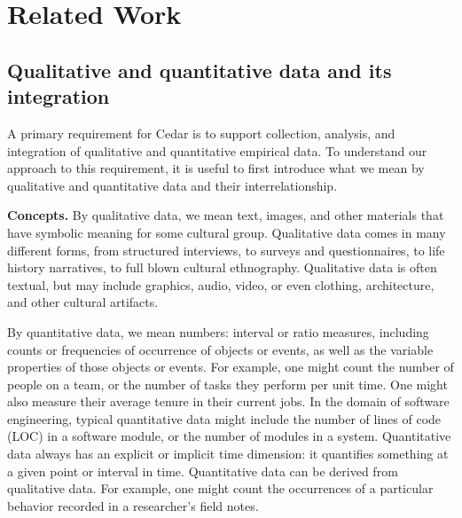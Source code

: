 \section{Related Work}

\subsection{Qualitative and quantitative data and its integration}

A primary requirement for Cedar is to support collection, analysis, and
integration of qualitative and quantitative empirical data.  To understand
our approach to this requirement, it is useful to first introduce what we
mean by qualitative and quantitative data and their interrelationship.

{\bf Concepts.} By qualitative data, we mean text, images, and other
materials that have symbolic meaning for some cultural group. Qualitative
data comes in many different forms, from structured interviews, to surveys
and questionnaires, to life history narratives, to full blown cultural
ethnography.  Qualitative data is often textual, but may include graphics,
audio, video, or even clothing, architecture, and other cultural artifacts.

By quantitative data, we mean numbers: interval or ratio measures,
including counts or frequencies of occurrence of objects or events, as well
as the variable properties of those objects or events.  For example, one
might count the number of people on a team, or the number of tasks they
perform per unit time. One might also measure their average tenure in their
current jobs.  In the domain of software engineering, typical quantitative
data might include the number of lines of code (LOC) in a software module,
or the number of modules in a system. Quantitative data always has an
explicit or implicit time dimension: it quantifies something at a given
point or interval in time.  Quantitative data can be derived from
qualitative data. For example, one might count the occurrences of a
particular behavior recorded in a researcher's field notes. 

